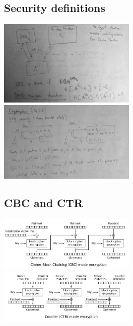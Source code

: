 \documentclass[a4paper,10pt]{article}
\begin{document}
\subsection*{Security definitions}
\includegraphics[width=0.5\textwidth]{PRF_security.jpg}
\includegraphics[width=0.5\textwidth]{CPA_security.jpg}
\subsection*{CBC and CTR}
\includegraphics[width=0.5\textwidth]{CBC.png}
\includegraphics[width=0.5\textwidth]{CTR.png}
\end{document}
